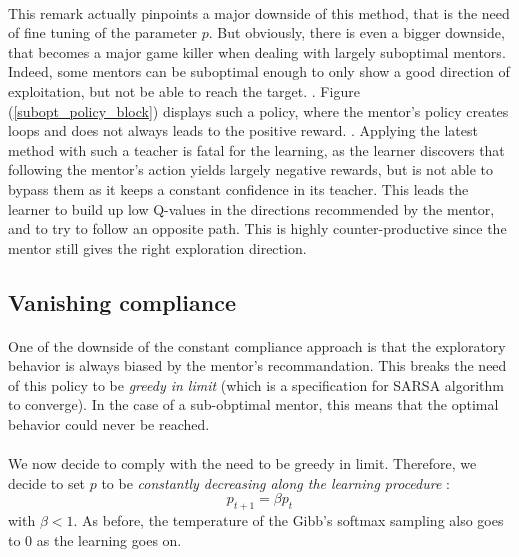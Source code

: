 \documentclass[a4paper]{report}
\begin{document}
{{{			\paragraph{} This remark actually pinpoints a major downside of this method, that is the need of fine tuning of the parameter $p$. But obviously, there is even a bigger downside, that becomes a major game killer when dealing with largely suboptimal mentors. Indeed, some mentors can be suboptimal enough to only show a good direction of exploitation, but not be able to reach the target. . Figure (\ref{subopt_policy_block}) displays such a policy, where the mentor's policy creates loops and does not always leads to the positive reward.  \newline. 
			Applying the latest method with such a teacher is fatal for the learning, as the learner discovers that following the mentor's action yields largely negative rewards, but is not able to bypass them as it keeps a constant confidence in its teacher. This leads the learner to build up low Q-values in the directions recommended by the mentor, and to try to follow an opposite path. This is highly counter-productive since the mentor still gives the right exploration direction. 
		
		\subsection{Vanishing compliance }
		{
			\paragraph{} One of the downside of the constant compliance approach is that the exploratory behavior is always biased by the mentor's recommandation. This breaks the need of this policy to be \emph{greedy in limit} (which is a specification for SARSA algorithm to converge). In the case of a sub-obptimal mentor, this means that the optimal behavior could never be reached. 
			
			\paragraph{} We now decide to comply with the need to be greedy in limit. Therefore, we decide to set $p$ to be \emph{constantly decreasing along the learning procedure} : 
			\begin{equation}
				p_{t+1} = \beta p_{t}
			\end{equation}
			with $\beta < 1$. As before, the temperature of the Gibb's softmax sampling also goes to $0$ as the learning goes on. 
			
}}}}
\end{document}
